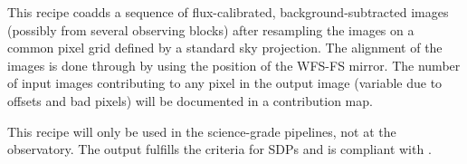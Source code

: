 This recipe coadds a sequence of flux-calibrated,
background-subtracted images (possibly from several observing blocks)
after resampling the images on a common pixel grid defined by a
standard sky projection.
The alignment of the images is done through by using the position of the \ac{WFS-FS} mirror.
The number of input
images contributing to any pixel in the output image (variable due to
offsets and bad pixels) will be documented in a contribution
map.

This recipe will only be used in the science-grade pipelines, not at
the observatory. The output fulfills the criteria for \ac{SDP}s and is compliant with .

